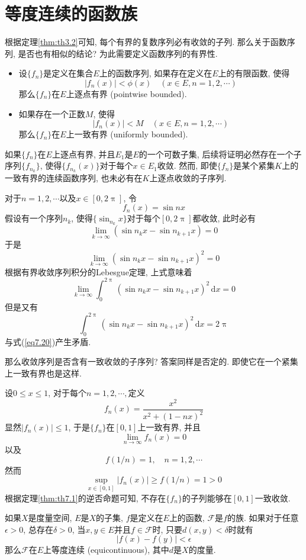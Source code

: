 \documentclass[cn,12pt,math=mtpro2,citestyle=gb7714-2015,bibstyle=gb7714-2015,twocol]{elegantbook}
\newcommand{\dx}{\,\text{d}x}
\newcommand{\limn}{\lim_{n\to\infty}}
\begin{document}
\section{等度连续的函数族}
根据定理\ref{thm:th3.2}可知, 每个有界的复数序列必有收敛的子列. 那么关于函数序列, 是否也有相似的结论? 为此需要定义函数序列的有界性.

\begin{definition}
\begin{itemize}
\item 设$\{f_n\}$是定义在集合$E$上的函数序列, 如果存在定义在$E$上的有限函数, 使得
$$|f_n(x)|<\phi(x)\quad (x\in E, n=1,2,\cdots)$$
那么$\{f_n\}$在$E$上逐点有界 (pointwise bounded).

\item 如果存在一个正数$M$, 使得
$$|f_n(x)|<M \quad (x\in E, n=1,2,\cdots)$$
那么$\{f_n\}$在$E$上一致有界 (uniformly bounded).
\end{itemize}
\end{definition}
如果$\{f_n\}$在$E$上逐点有界, 并且$E_1$是$E$的一个可数子集, 后续将证明必然存在一个子序列$\{f_{n_k}\}$, 使得$\{f_{n_k}(x)\}$对于每个$x\in E_1$收敛. 然而, 即使$\{f_n\}$是某个紧集$K$上的一致有界的连续函数序列, 也未必有在$K$上逐点收敛的子序列.
\begin{example}
对于$n=1,2,\cdots$以及$x\in [0,2\uppi]$, 令
$$f_n(x)=\sin nx$$
假设有一个序列$n_k$, 使得$\{\sin_{n_k}x\}$对于每个$[0,2\uppi]$都收敛, 此时必有
$$\lim_{k\to\infty}(\sin n_kx-\sin n_{k+1}x)=0$$
于是
$$\lim_{k\to\infty}(\sin n_kx-\sin n_{k+1}x)^2=0$$
根据有界收敛序列积分的Lebesgue定理, 上式意味着
\begin{equation}\label{eq7.20}
  \lim_{k\to\infty}\int_{0}^{2\uppi}(\sin n_kx-\sin n_{k+1}x)^2\dx=0
\end{equation}
但是又有
$$\int_{0}^{2\uppi}(\sin n_kx-\sin n_{k+1}x)^2\dx=2\uppi$$
与式(\ref{eq7.20})产生矛盾.
\end{example}
那么收敛序列是否含有一致收敛的子序列? 答案同样是否定的. 即使它在一个紧集上一致有界也是这样.
\begin{example}\label{ex4}
设$0\leq x\leq 1$, 对于每个$n=1,2,\cdots,$定义
$$f_n(x)=\frac{x^2}{x^2+(1-nx)^2}$$
显然$|f_n(x)|\leq 1$, 于是$\{f_n\}$在$[0,1]$上一致有界, 并且
$$\limn f_n(x)=0$$
以及
$$f(1/n)=1,\quad n=1,2,\cdots$$
然而
$$\sup_{x\in[0,1]}|f_n(x)|\geq f(1/n)=1>0$$
根据定理\ref{thm:th7.1}的逆否命题可知, 不存在$\{f_n\}$的子列能够在$[0,1]$一致收敛.
\end{example}
\begin{definition}
如果$X$是度量空间, $E$是$X$的子集, $f$是定义在$E$上的函数, $\mathscr{F}$是$f$的族. 如果对于任意$\epsilon>0$, 总存在$\delta>0$, 当$x,y\in E$并且$f\in\mathscr{F}$时, 只要$d(x,y)<\delta$时就有
$$|f(x)-f(y)|<\epsilon$$
那么$\mathscr{F}$在$E$上等度连续 (equicontinuous), 其中$d$是$X$的度量.
\end{definition}
\end{document}
